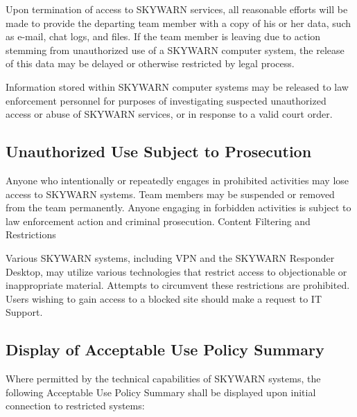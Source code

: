 \documentclass[pdflatex,letterpaper,twoside,12pt]{book}
\begin{document}
Upon termination of access to SKYWARN services, all reasonable efforts will be made to provide the departing team member with a copy of his or her data, such as e-mail, chat logs, and files.  If the team member is leaving due to action stemming from unauthorized use of a SKYWARN computer system, the release of this data may be delayed or otherwise restricted by legal process.

Information stored within SKYWARN computer systems may be released to law enforcement personnel for purposes of investigating suspected unauthorized access or abuse of SKYWARN services, or in response to a valid court order.

\subsection{Unauthorized Use Subject to Prosecution}

Anyone who intentionally or repeatedly engages in prohibited activities may lose access to SKYWARN systems.  Team members may be suspended or removed from the team permanently.  Anyone engaging in forbidden activities is subject to law enforcement action and criminal prosecution.
Content Filtering and Restrictions

Various SKYWARN systems, including VPN and the SKYWARN Responder Desktop, may utilize various technologies that restrict access to objectionable or inappropriate material.  Attempts to circumvent these restrictions are prohibited.  Users wishing to gain access to a blocked site should make a request to IT Support.

\subsection{Display of Acceptable Use Policy Summary}

Where permitted by the technical capabilities of SKYWARN systems, the following Acceptable Use Policy Summary shall be displayed upon initial connection to restricted systems:
\end{document}
